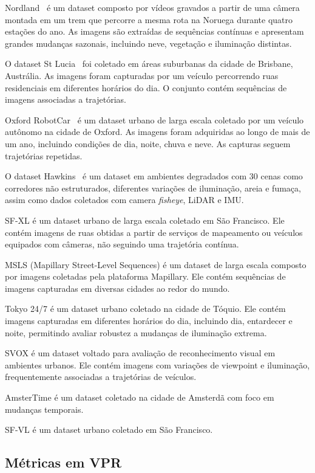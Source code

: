 \documentclass[letterpaper, 10 pt, conference]{ieeeconf}  %
\begin{document}
Nordland~\cite{nordland} é um dataset composto por vídeos gravados a partir de uma câmera montada em um trem que percorre a mesma rota na Noruega durante quatro estações do ano. As imagens são extraídas de sequências contínuas e apresentam grandes mudanças sazonais, incluindo neve, vegetação e iluminação distintas.


O dataset St Lucia~\cite{st_lucia} foi coletado em áreas suburbanas da cidade de Brisbane, Austrália. As imagens foram capturadas por um veículo percorrendo ruas residenciais em diferentes horários do dia. O conjunto contém sequências de imagens associadas a trajetórias.

Oxford RobotCar~\cite{oxfordrobotcar} é um dataset urbano de larga escala coletado por um veículo autônomo na cidade de Oxford. As imagens foram adquiridas ao longo de mais de um ano, incluindo condições de dia, noite, chuva e neve. As capturas seguem trajetórias repetidas.


O dataset Hawkins~\cite{hawkins} é um dataset em ambientes degradados com 30 cenas como corredores não estruturados, diferentes variações de iluminação, areia e fumaça, assim como dados coletados com camera \textit{fisheye}, LiDAR e IMU.

SF-XL\cite{sf-xl} é um dataset urbano de larga escala coletado em São Francisco. Ele contém imagens de ruas obtidas a partir de serviços de mapeamento ou veículos equipados com câmeras, não seguindo uma trajetória contínua.

MSLS (Mapillary Street-Level Sequences) é um dataset de larga escala composto por imagens coletadas pela plataforma Mapillary. Ele contém sequências de imagens capturadas em diversas cidades ao redor do mundo.


Tokyo 24/7 é um dataset urbano coletado na cidade de Tóquio. Ele contém imagens capturadas em diferentes horários do dia, incluindo dia, entardecer e noite, permitindo avaliar robustez a mudanças de iluminação extrema.


SVOX é um dataset voltado para avaliação de reconhecimento visual em ambientes urbanos. Ele contém imagens com variações de viewpoint e iluminação, frequentemente associadas a trajetórias de veículos.

AmsterTime \cite{amstertime} é um dataset coletado na cidade de Amsterdã com foco em mudanças temporais.

SF-VL é um dataset urbano coletado em São Francisco.

\subsection{Métricas em VPR}
\end{document}
